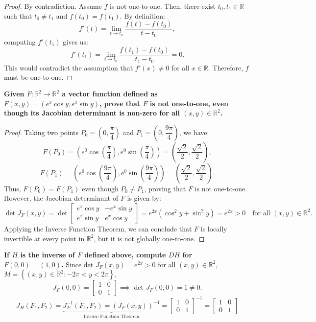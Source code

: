 \documentclass[11pt]{article}
\begin{document}
\begin{proof}
    By contradiction. Assume \(f\) is not one-to-one. Then, there exist \(t_0, t_1 \in \mathbb{R}\) such that \(t_0 \neq t_1\) and \(f(t_0) = f(t_1)\). By definition:
    \[f'(t) = \lim_{t \to t_0} \frac{f(t) - f(t_0)}{t - t_0},\]
    computing \(f'(t_1)\) gives us:
    \[f'(t_1) = \lim_{t \to t_0} \frac{f(t_1) - f(t_0)}{t_1 - t_0} = 0.\]
    This would contradict the assumption that \(f'(x) \neq 0\) for all \(x \in \mathbb{R}\). Therefore, \(f\) must be one-to-one.
\end{proof}
\vskip 0.5cm
\textbf{Given \(F : \mathbb{R}^2 \to \mathbb{R}^2\) a vector function defined as \(F(x, y) = (e^x \cos y, e^x \sin y)\), prove that \(F\) is not one-to-one, even though its Jacobian determinant is non-zero for all \((x, y) \in \mathbb{R}^2\).}
\vskip 0.5cm
\begin{proof}
    Taking two points \(P_0 = \left(0, \dfrac{\pi}{4}\right)\) and \(P_1 = \left(0, \dfrac{9\pi}{4}\right)\), we have:
    \[F(P_0) = \left(e^0 \cos\left(\frac{\pi}{4}\right), e^0 \sin\left(\frac{\pi}{4}\right)\right) = \left(\frac{\sqrt{2}}{2}, \frac{\sqrt{2}}{2}\right),\]
    \[F(P_1) = \left(e^0 \cos\left(\frac{9\pi}{4}\right), e^0 \sin\left(\frac{9\pi}{4}\right)\right) = \left(\frac{\sqrt{2}}{2}, \frac{\sqrt{2}}{2}\right).\]
    Thus, \(F(P_0) = F(P_1)\) even though \(P_0 \neq P_1\), proving that \(F\) is not one-to-one. However, the Jacobian determinant of \(F\) is given by:
    \[\det J_F(x, y) = \det \begin{bmatrix} e^x \cos y & -e^x \sin y \\ e^x \sin y & e^x \cos y \end{bmatrix} = e^{2x} (\cos^2 y + \sin^2 y) = e^{2x} > 0 \quad \text{for all } (x, y) \in \mathbb{R}^2.\]
    Applying the Inverse Function Theorem, we can conclude that \(F\) is locally invertible at every point in \(\mathbb{R}^2\), but it is not globally one-to-one.
\end{proof}
\vskip 0.5cm
\textbf{If \(H\) is the inverse of \(F\) defined above, compute \(DH\) for \(F(0, 0) = (1, 0)\).}
\vskip 0.5cm
Since det \(J_F(x, y) = e^{2x} > 0\) for all \((x, y) \in \mathbb{R}^2\), \(M = \left\{(x, y) \in \mathbb{R}^2 : -2\pi < y < 2\pi\right\}\),
\[J_F(0, 0) = \begin{bmatrix} 1 & 0 \\ 0 & 1 \end{bmatrix} \implies \text{ det } J_F(0, 0) = 1 \neq 0.\]
\[J_H(F_1, F_2) = \underbrace{J_F^{-1}(F_1, F_2) = (J_F(x, y))^{-1}}_{\text{Inverse Function Theorem}} = \begin{bmatrix} 1 & 0 \\ 0 & 1 \end{bmatrix}^{-1} = \begin{bmatrix} 1 & 0 \\ 0 & 1 \end{bmatrix}\]
\end{document}

